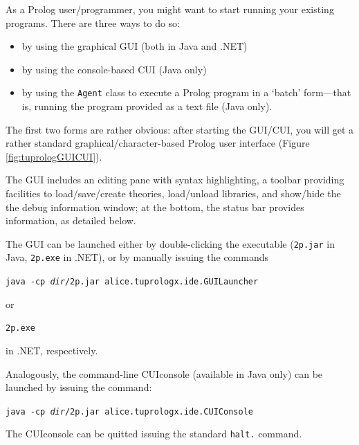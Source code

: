 As a Prolog user/programmer, you might want to start running your existing programs.
%
There are three ways to do so:
\begin{itemize}
  \item by using the graphical \tuprolog{} GUI (both in Java and .NET)
  \item by using the console-based \tuprolog{} CUI  (Java only)
  \item by using the \texttt{Agent} class to execute a Prolog program in a `batch' form---that is, running the program provided as a text file (Java only).
\end{itemize}

The first two forms are rather obvious: after starting the GUI/CUI, you will get a rather standard graphical/character-based Prolog user interface (Figure \ref{fig:tuprologGUICUI}).

The GUI includes an editing pane with syntax highlighting, a toolbar providing facilities to load/save/create theories, load/unload libraries, and show/hide the the debug information window; at the bottom, the status bar provides information, as detailed below.

The GUI can be launched either by double-clicking the \tuprolog{} executable (\texttt{2p.jar} in Java, \texttt{2p.exe} in .NET), or by manually issuing the commands

\texttt{java -cp \emph{dir}/2p.jar alice.tuprologx.ide.GUILauncher}

\noindent or

\texttt{2p.exe}

\noindent in .NET, respectively.

Analogously, the command-line CUIconsole (available in Java only) can be launched by issuing the command:

\texttt{java -cp \emph{dir}/2p.jar alice.tuprologx.ide.CUIConsole}

\noindent The CUIconsole can be quitted issuing the standard \texttt{halt.} command.

